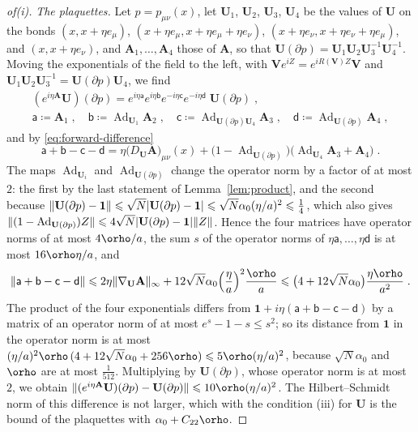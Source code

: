 \documentclass[11pt]{preprint}
\let\rho\orho
\newcommand{\id}{\mathbf 1}
\newcommand{\Ad}{\operatorname{Ad}}
\DeclarePairedDelimiter{\abs}{\lvert}{\rvert}
\DeclarePairedDelimiter{\norm}{\lVert}{\rVert}
\numberwithin{equation}{section}
\begin{document}
\begin{proof}[of(i)]
\emph{The plaquettes.} Let $p = p_{\mu\nu}(x)$, let $\mathbf U_1$, $\mathbf U_2$, $\mathbf U_3$, $\mathbf U_4$ be the values of $\mathbf U$ on the bonds $(x, x + \eta e_\mu)$, $(x + \eta e_\mu, x + \eta e_\mu + \eta e_\nu)$, $(x + \eta e_\nu, x + \eta e_\nu + \eta e_\mu)$, and $(x, x + \eta e_\nu)$, and $\mathbf A_1, \dots, \mathbf A_4$ those of $\mathbf A$, so that $\mathbf U(\partial p) = \mathbf U_1\mathbf U_2\mathbf U_3^{-1}\mathbf U_4^{-1}$. Moving the exponentials of the field to the left, with $\mathbf Ve^{iZ} = e^{iR(\mathbf V)Z}\mathbf V$ and $\mathbf U_1\mathbf U_2\mathbf U_3^{-1} = \mathbf U(\partial p)\mathbf U_4$, we find
\begin{equation}\label{eq:moved-plaquette}
\begin{gathered}
    (e^{i\eta\mathbf A}\mathbf U)(\partial p) = e^{i\eta\mathsf a}e^{i\eta\mathsf b}e^{-i\eta\mathsf c}e^{-i\eta\mathsf d}\;\mathbf U(\partial p)\;,\\
    \mathsf a \coloneqq \mathbf A_1\;,\quad
    \mathsf b \coloneqq \Ad_{\mathbf U_1}\mathbf A_2\;,\quad
    \mathsf c \coloneqq \Ad_{\mathbf U(\partial p)\mathbf U_4}\mathbf A_3\;,\quad
    \mathsf d \coloneqq \Ad_{\mathbf U(\partial p)}\mathbf A_4\;,
\end{gathered}
\end{equation}
and by \eqref{eq:forward-difference}
\[
    \mathsf a + \mathsf b - \mathsf c - \mathsf d = \eta\bigl(D_{\mathbf U}\mathbf A\bigr)_{\mu\nu}(x) + \bigl(1 - \Ad_{\mathbf U(\partial p)}\bigr)\bigl(\Ad_{\mathbf U_4}\mathbf A_3 + \mathbf A_4\bigr)\;.
\]
The maps $\Ad_{\mathbf U_i}$ and $\Ad_{\mathbf U(\partial p)}$ change the operator norm by a factor of at most $2$: the first by the last statement of Lemma~\ref{lem:product}, and the second because $\norm{\mathbf U(\partial p) - \id} \leqslant \sqrt N\abs{\mathbf U(\partial p) - \id} \leqslant \sqrt N\alpha_0(\eta/a)^2 \leqslant \frac{1}{4}$, which also gives $\norm{(1 - \Ad_{\mathbf U(\partial p)})Z} \leqslant 4\sqrt N\abs{\mathbf U(\partial p) - \id}\norm Z$. Hence the four matrices have operator norms of at most $4\rho/a$, the sum $s$ of the operator norms of $\eta\mathsf a, \dots, \eta\mathsf d$ is at most $16\rho\eta/a$, and
\[
    \norm{\mathsf a + \mathsf b - \mathsf c - \mathsf d} \leqslant 2\eta\norm{\nabla_{\mathbf U}\mathbf A}_\infty + 12\sqrt N\alpha_0\Bigl(\frac{\eta}{a}\Bigr)^2\frac{\rho}{a} \leqslant \bigl(4 + 12\sqrt N\alpha_0\bigr)\frac{\eta\rho}{a^2}\;.
\]
The product of the four exponentials differs from $\id + i\eta(\mathsf a + \mathsf b - \mathsf c - \mathsf d)$ by a matrix of an operator norm of at most $e^s - 1 - s \leqslant s^2$; so its distance from $\id$ in the operator norm is at most $(\eta/a)^2\rho\,(4 + 12\sqrt N\alpha_0 + 256\rho) \leqslant 5\rho(\eta/a)^2$, because $\sqrt N\alpha_0$ and $\rho$ are at most $\frac{1}{512}$. Multiplying by $\mathbf U(\partial p)$, whose operator norm is at most $2$, we obtain $\norm{(e^{i\eta\mathbf A}\mathbf U)(\partial p) - \mathbf U(\partial p)} \leqslant 10\rho(\eta/a)^2$. The Hilbert--Schmidt norm of this difference is not larger, which with the condition (iii) for $\mathbf U$ is the bound of the plaquettes with $\alpha_0 + C_{22}\rho$.


\end{proof}
\end{document}

